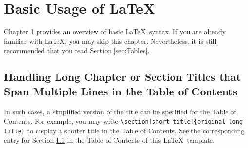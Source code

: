 
\chapter{Basic Usage of \LaTeX}	\label{chap:LaTeX}

Chapter \ref{chap:LaTeX} provides an overview of basic \LaTeX~syntax.
If you are already familiar with \LaTeX, you may skip this chapter.
Nevertheless, it is still recommended that you read Section \ref{sec:Tables}.



\section[Handling Long Chapter or Section Titles]{Handling Long Chapter or Section Titles that Span Multiple Lines in the Table of Contents}	\label{sec:LongTitle}

In such cases, a simplified version of the title can be specified for the Table of Contents.
For example, you may write \verb|\section[short title]{original long| \verb|title}| to display a shorter title in the Table of Contents.
See the corresponding entry for Section \ref{sec:LongTitle} in the Table of Contents of this \LaTeX~template.



